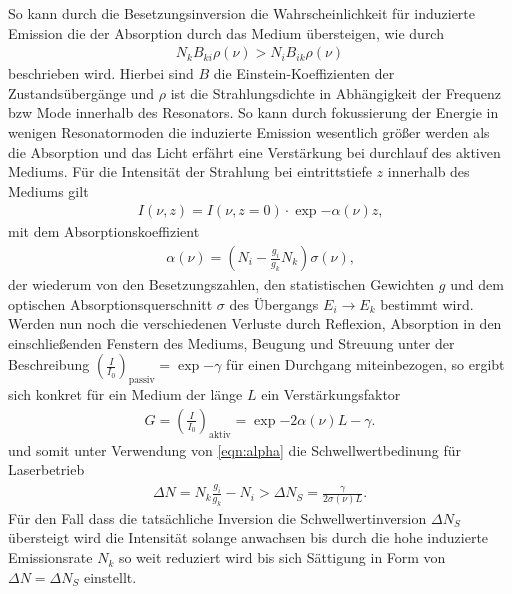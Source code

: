 So kann durch die Besetzungsinversion die Wahrscheinlichkeit für induzierte Emission die der Absorption durch das Medium übersteigen, wie durch
\begin{align}
    N_kB_{ki}\rho(\nu)>N_iB_{ik}\rho(\nu)
\end{align}
beschrieben wird. Hierbei sind $B$ die Einstein-Koeffizienten der Zustandsübergänge und $\rho$ ist die Strahlungsdichte in Abhängigkeit der Frequenz bzw Mode innerhalb des Resonators. So kann durch fokussierung der Energie in wenigen Resonatormoden die induzierte Emission wesentlich größer werden als die Absorption und das Licht erfährt eine Verstärkung bei durchlauf des aktiven Mediums.
Für die Intensität der Strahlung bei eintrittstiefe $z$ innerhalb des Mediums gilt
\begin{align}
    I(\nu,z) = I(\nu,z=0)\cdot\exp{-\alpha(\nu)z}\text{,}
\end{align}
mit dem Absorptionskoeffizient 
\begin{align}
    \alpha(\nu)=(N_i-\frac{g_i}{g_k}N_k)\sigma(\nu)\text{,}\label{eqn:alpha}
\end{align}
der wiederum von den Besetzungszahlen, den statistischen Gewichten $g$ und dem optischen Absorptionsquerschnitt $\sigma$ des Übergangs $E_i \rightarrow E_k$ bestimmt wird.
Werden nun noch die verschiedenen Verluste durch Reflexion, Absorption in den einschließenden Fenstern des Mediums, Beugung und Streuung unter der Beschreibung $(\frac{I}{I_0})_\text{passiv} = \exp{-\gamma}$ für einen Durchgang miteinbezogen, so ergibt sich konkret für ein Medium der länge $L$ ein Verstärkungsfaktor
\begin{align}
    G= \left(\frac{I}{I_0}\right)_\text{aktiv}=\exp{-2\alpha(\nu)L-\gamma}\text{.}\label{eqn:G}
\end{align}
und somit unter Verwendung von \autoref{eqn:alpha} die Schwellwertbedinung für Laserbetrieb
\begin{align}
    \Delta N = N_k\frac{g_i}{g_k}-N_i>\Delta N_S = \frac{\gamma}{2\sigma(\nu)L}\text{.}
\end{align}
Für den Fall dass die tatsächliche Inversion die Schwellwertinversion $\Delta N_S$ übersteigt wird die Intensität solange anwachsen bis durch die hohe induzierte Emissionsrate $N_k$ so weit reduziert wird bis sich Sättigung in Form von $\Delta N = \Delta N_S$ einstellt.

